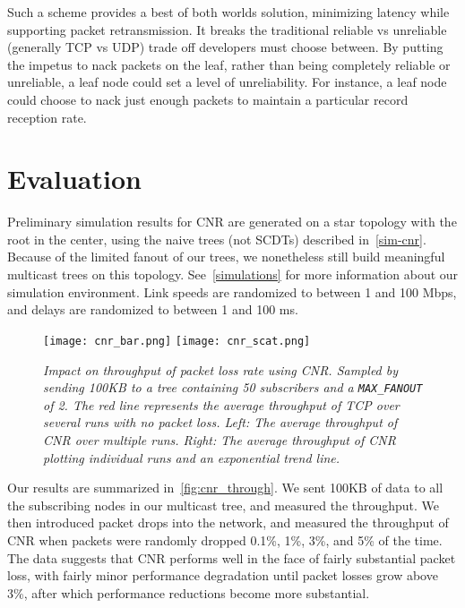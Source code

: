 Such a scheme provides a best of both worlds solution, minimizing latency while
supporting packet retransmission.  It breaks the
traditional reliable vs unreliable (generally TCP vs UDP) trade off developers
must choose between.  By putting the impetus to nack packets on the leaf, rather
than being completely reliable or unreliable, a leaf node could set a level of
unreliability.  For instance, a leaf node could choose to nack just enough
packets to maintain a particular record reception rate.


\section{Evaluation}
\label{cnr-eval}
Preliminary simulation results for CNR are generated on a star topology with the root in the center, using the naive trees (not SCDTs) described in~\autoref{sim-cnr}. Because of the limited fanout  of our trees, we nonetheless still build meaningful multicast trees on this topology.  See~\autoref{simulations} for more information about our simulation environment.  Link speeds are randomized to between 1 and 100 Mbps, and delays are randomized to between 1 and 100 ms.

\begin{figure}[h]
	\begin{center}
		\texttt{[image: cnr\_bar.png]}
		\texttt{[image: cnr\_scat.png]}
	\end{center}
	\vspace{-1.3em}
	\caption{\small \itshape Impact on throughput of packet loss rate using CNR. Sampled by sending 100KB to a tree containing 50 subscribers and a \texttt{MAX\_FANOUT} of 2. The red line represents the average throughput of TCP over several runs with no packet loss.  Left: The average throughput of CNR over multiple runs. Right: The average throughput of CNR plotting individual runs and an exponential trend line.}
	\vspace{-1em}
	\label{fig:cnr_through}
\end{figure}

Our results are summarized in~\autoref{fig:cnr_through}. We sent 100KB of data to all the subscribing nodes in our multicast tree, and measured the throughput. We then introduced packet drops into the network, and measured the throughput of CNR when packets were randomly dropped 0.1\%, 1\%, 3\%, and 5\% of the time. The data suggests that CNR performs well in the face of fairly substantial packet loss, with fairly minor performance degradation until packet losses grow above 3\%, after which performance reductions become more substantial. 

